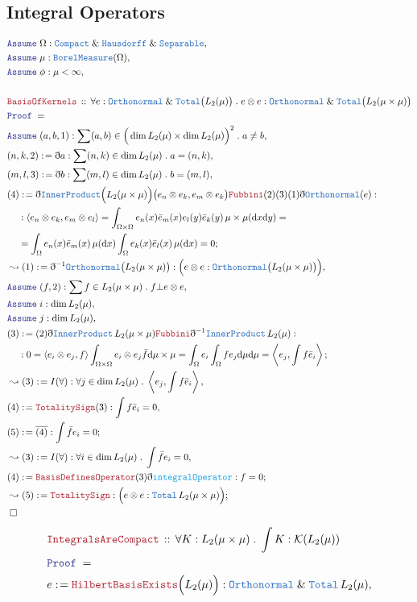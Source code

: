 \documentclass[12pt]{scrartcl}
\newcommand{\TYPE}[1]{\textcolor{NavyBlue}{\mathtt{#1}}}
\newcommand{\FUNC}[1]{\textcolor{Cerulean}{\mathtt{#1}}}
\newcommand{\LOGIC}[1]{\textcolor{Blue}{\mathtt{#1}}}
\newcommand{\THM}[1]{\textcolor{Maroon}{\mathtt{#1}}}
\renewcommand{\.}{\; . \;}
\newcommand{\de}{: \kern 0.1pc =}
\newcommand{\Theorem}[2]{& \THM{#1} \, :: \, #2 \\ & \Proof = \\ }
\newcommand{\NewLine}{\\ & \kern 1pc}
\newcommand{\Page}[1]{\begin{align*} #1 \end{align*} \newpage   }
\newcommand{ \bd }{ \ByDef }
\renewcommand{\And}{\; \& \;}
\newcommand{\Say}[3]{& #1 \de #2 : #3, \\}
\newcommand{\Conclude}[3]{& #1 \de #2 : #3; \\}
\newcommand{\Derive}[3]{& \leadsto #1 \de #2 : #3, \\}
\newcommand{\DeriveConclude}[3]{& \leadsto #1 \de #2 : #3 ; \\}
\newcommand{\A}{\LOGIC{Assume} \;}
\newcommand{\Assume}[2]{& \A #1 : #2, \\}
\newcommand{\QED}{\; \square}
\newcommand{\EndProof}{& \QED \\}
\newcommand{\ByDef}{\eth}
\newcommand{\Proof}{\LOGIC{Proof} \; }
\newcommand{\K}{\mathcal{K}} %
\renewcommand{\O}{\Omega}
\begin{document}
\subsection{Integral Operators}
\Page{
	\Assume{\O}{\TYPE{Compact} \And \TYPE{Hausdorff} \And \TYPE{Separable}}
	\Assume{\mu}{ \TYPE{BorelMeasure}(\O)}
	\Assume{\phi}{ \mu < \infty}
	\\
	\Theorem{BasisOfKernels}{\forall e : \TYPE{Orthonormal} \And \TYPE{Total}\big(L_2(\mu)\big) 
	 \.  e \otimes e : \TYPE{Orthonormal} \And \TYPE{Total}\big( L_2(\mu \times \mu) \big)
	}
	\Assume{(a,b,1)}{\sum (a,b) \in \Big(\dim L_2(\mu ) \times \dim L_2(\mu)\Big)^2 \. a \neq b}
	\Say{(n,k,2)}{ \bd a}{ \sum (n,k) \in \dim L_2(\mu) \. a = (n,k)}
	\Say{(m,l,3)}{\bd b}{\sum (m,l) \in \dim L_2(\mu) \. b = (m,l)}
	\Conclude{(4)}{
		\bd \TYPE{InnerProduct}\Big( L_2(\mu \times \mu) \Big) \big( e_n \otimes e_k, e_m \otimes e_k  \big)
		\THM{Fubbini}  (2)(3)(1) \bd \TYPE{Orthonormal}(e)
	}
	{ 
		\NewLine :
		\langle e_n \otimes e_k, e_m \otimes e_l \rangle = 
		\int_{\O \times \O} e_n(x)\bar e_m(x)e_l(y)\bar e_k(y) \,\mu \times \mu(\mathrm{d}x \mathrm{d}y) = \NewLine
		= \int_\O e_n(x)\bar e_m(x)\, \mu(\mathrm{d}x) \int_\O e_k(x) \bar e_l(x) \, \mu(\mathrm{d}x) = 0
	}
	\Derive{(1)}{\bd^{-1} \TYPE{Orthonormal}\big( L_2(\mu \times \mu) \big)}
	{ \Big(e \otimes e : \TYPE{Orthonormal}\big( L_2(\mu \times \mu) \big) \Big)  }
	\Assume{(f,2)}{\sum f \in L_2(\mu \times \mu) \. f \bot e \otimes e}
	\Assume{i}{\dim L_2(\mu)}
	\Assume{j}{\dim L_2(\mu)}
	\Conclude{(3)}{  
		(2)\bd \TYPE{InnerProduct} \, L_2(\mu \times \mu)
		\THM{Fubbini}
		\bd^{-1} \TYPE{InnerProduct} \, L_2(\mu)
	}
	{ 
		\NewLine :
		0 = \langle e_i \otimes e_j, f \rangle
		\int_{\O \times \O} e_i \otimes e_j \bar f  \mathrm{d} \mu \times \mu  =
		\int_\O e_i \int_\O f e_j \mathrm{d}\mu \mathrm{d}\mu =
		\left\langle e_j, \int  f \bar e_i \right\rangle
	}
	\Derive{(3)}{I(\forall)}{\forall j \in \dim L_2(\mu) \. \left\langle e_j, \int  f \bar e_i \right\rangle}
	\Say{(4)}{\THM{TotalitySign}(3)}{ \int f \bar e_i = 0 }
	\Conclude{(5)}{\overline{(4)}}{ \int  \bar f e_i = 0 }
	\Derive{(3)}{I(\forall)}{\forall i \in \dim L_2(\mu) \. \int  \bar f e_i = 0}
	\Conclude{(4)}{\THM{BasisDefinesOperator}(3)\bd \FUNC{integralOperator}}{f =  0}
	\DeriveConclude{(5)}{\THM{TotalitySign}}{\Big(e \otimes e : \TYPE{Total} \, L_2 ( \mu \times \mu ) \Big)}
	\EndProof
}\Page{
        \Theorem{IntegralsAreCompact}{\forall K : L_2(\mu \times \mu) \. \int K : \K(L_2(\mu))  }
	\Say{e}{\THM{HilbertBasisExists}\Big( L_2(\mu) \Big)}
	{\TYPE{Orthonormal} \And \TYPE{Total} \, L_2(\mu) }
}
\end{document}
